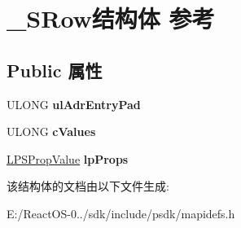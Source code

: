 \hypertarget{struct___s_row}{}\section{\+\_\+\+S\+Row结构体 参考}
\label{struct___s_row}
\subsection*{Public 属性}
\begin{DoxyCompactItemize}
\item 
\mbox{\label{struct___s_row_a1b8c185f79786218b19fce8ef973d5d1}} 
U\+L\+O\+NG {\bfseries ul\+Adr\+Entry\+Pad}
\item 
\mbox{\label{struct___s_row_afc918f69c75b6ccd0db4c56088b13e42}} 
U\+L\+O\+NG {\bfseries c\+Values}
\item 
\mbox{\label{struct___s_row_a10ad9ba08eabe148ed7ce52ad15fd327}} 
\hyperlink{struct___s_prop_value}{L\+P\+S\+Prop\+Value} {\bfseries lp\+Props}
\end{DoxyCompactItemize}


该结构体的文档由以下文件生成\+:\begin{DoxyCompactItemize}
\item 
E\+:/\+React\+O\+S-\/0../sdk/include/psdk/mapidefs.\+h\end{DoxyCompactItemize}
